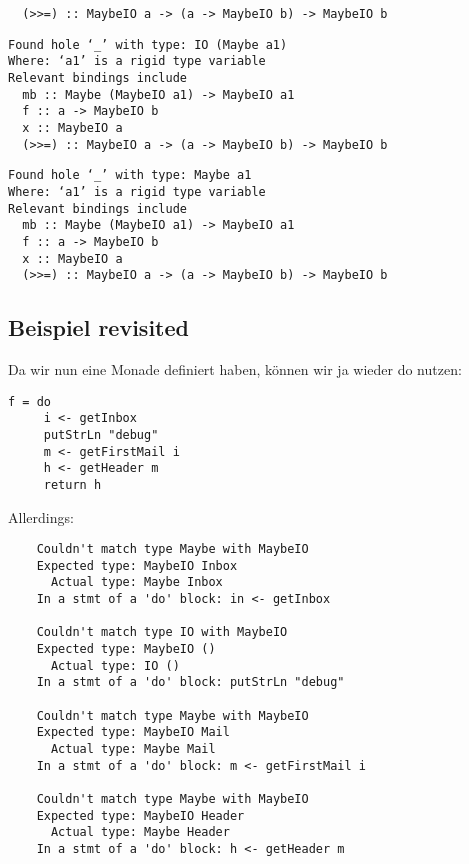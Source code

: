 \documentclass{beamer}
\begin{document}
\begin{frame}[fragile]
\begin{overprint}
\begin{verbatim}
  (>>=) :: MaybeIO a -> (a -> MaybeIO b) -> MaybeIO b
\end{verbatim}
\begin{verbatim}
Found hole ‘_’ with type: IO (Maybe a1)
Where: ‘a1’ is a rigid type variable
Relevant bindings include
  mb :: Maybe (MaybeIO a1) -> MaybeIO a1
  f :: a -> MaybeIO b
  x :: MaybeIO a
  (>>=) :: MaybeIO a -> (a -> MaybeIO b) -> MaybeIO b
\end{verbatim}
\begin{verbatim}
Found hole ‘_’ with type: Maybe a1
Where: ‘a1’ is a rigid type variable
Relevant bindings include
  mb :: Maybe (MaybeIO a1) -> MaybeIO a1
  f :: a -> MaybeIO b
  x :: MaybeIO a
  (>>=) :: MaybeIO a -> (a -> MaybeIO b) -> MaybeIO b
\end{verbatim}
\end{overprint}
\end{frame}

\subsection{Beispiel revisited}
\begin{frame}[fragile]
Da wir nun eine Monade definiert haben, können wir ja wieder do nutzen:
\begin{verbatim}
f = do
     i <- getInbox
     putStrLn "debug"
     m <- getFirstMail i
     h <- getHeader m
     return h
\end{verbatim}
\end{frame}
\begin{frame}[fragile]
Allerdings:
\begin{verbatim}
    Couldn't match type Maybe with MaybeIO
    Expected type: MaybeIO Inbox
      Actual type: Maybe Inbox
    In a stmt of a 'do' block: in <- getInbox

    Couldn't match type IO with MaybeIO
    Expected type: MaybeIO ()
      Actual type: IO ()
    In a stmt of a 'do' block: putStrLn "debug"

    Couldn't match type Maybe with MaybeIO
    Expected type: MaybeIO Mail
      Actual type: Maybe Mail
    In a stmt of a 'do' block: m <- getFirstMail i
    
    Couldn't match type Maybe with MaybeIO
    Expected type: MaybeIO Header
      Actual type: Maybe Header
    In a stmt of a 'do' block: h <- getHeader m
\end{verbatim}
\end{frame}
\end{document}
